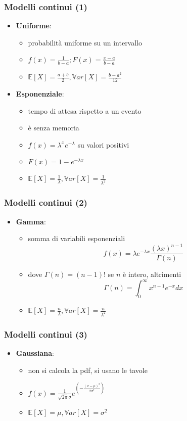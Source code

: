 \documentclass{beamer}
\begin{document}
\begin{frame}[fragile]
	\frametitle{Modelli continui (1)}

	\begin{itemize}
		\item \textbf{Uniforme}: \begin{itemize}
			      \item probabilità uniforme su un intervallo
			      \item $f(x) = \frac{1}{b-a}; F(x) = \frac{x-a}{b-a}$
			      \item $\mathbb{E}[X] = \frac{a+b}{2}, \mathbb{V}ar[X] = \frac{b-a^2}{12}$
		      \end{itemize}
		\item \textbf{Esponenziale}: \begin{itemize}
			      \item tempo di attesa rispetto a un evento
			      \item è senza memoria
			      \item $f(x) = \lambda^x e^{-\lambda}$ su valori positivi
			      \item $F(x) = 1 - e^{-\lambda x}$
			      \item $\mathbb{E}[X] = \frac{1}{\lambda}, \mathbb{V}ar[X] = \frac{1}{\lambda^2}$
		      \end{itemize}
	\end{itemize}

\end{frame}
	
\begin{frame}[fragile]
	\frametitle{Modelli continui (2)}
	
	\begin{itemize}
		\item \textbf{Gamma}: \begin{itemize}
			\item somma di variabili esponenziali
			\[
				f(x) = \lambda e^{-\lambda x} \frac{(\lambda x)^{n-1}}{\Gamma(n)}
				\]
			\item dove $\Gamma(n) = (n-1)!$ se $n$ è intero, altrimenti
			\[
				\Gamma(n) = \int_0^\infty x^{n-1} e^{-x} dx
			\]
			\item $\mathbb{E}[X] = \frac{n}{\lambda}, \mathbb{V}ar[X] = \frac{n}{\lambda^2}$
		\end{itemize}
	\end{itemize}
\end{frame}

\begin{frame}[fragile]
	\frametitle{Modelli continui (3)}

	\begin{itemize}
		\item \textbf{Gaussiana}: \begin{itemize}
			      \item non si calcola la pdf, si usano le tavole
			      \item $f(x) = \frac{1}{\sqrt{2\pi}\sigma}e^{( -\frac{(x-\mu)^2}{2\sigma^2})}$
			      \item $\mathbb{E}[X] = \mu, \mathbb{V}ar[X] = \sigma^2$
		      \end{itemize}
	\end{itemize}
\end{frame}
\end{document}
